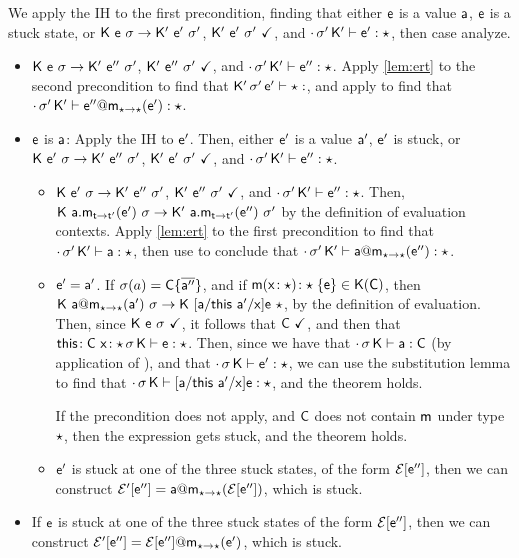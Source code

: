 \documentclass[acmlarge, anonymous, authordraft]{acmart}
\begin{document}
\begin{itemize}
      We apply the IH to the first precondition, finding that either ${\sf{e}}$ is a value ${\sf{a}}$, ${\sf{e}}$ is a stuck state, or ${{\sf{K}}}~{{\sf{e}}}~{\sigma} \rightarrow {{\ensuremath{{\sf{K'}}}}}~{{{{\sf{e'}}}}}~{{{\sigma'}}}$, ${{\sf{K'}}}~{{{\sf{e'}}}}~{{\sigma'}}~\checkmark$, and $\cdot\,{{\sigma'}}\,{{\sf{K'}}}\vdash {{\ensuremath{{\sf{e'}}}}} : \star$, then case analyze.
      \begin{itemize}
        \item ${{\sf{K}}}~{{\sf{e}}}~{\sigma} \rightarrow {{\ensuremath{{\sf{K'}}}}}~{{{{\sf{e''}}}}}~{{{\sigma'}}}$, ${{\sf{K'}}}~{{{\sf{e''}}}}~{{\sigma'}}~\checkmark$, and $\cdot\,{{\sigma'}}\,{{\sf{K'}}}\vdash {{\ensuremath{{\sf{e''}}}}} : \star$. Apply \ref{lem:ert} to the second precondition to find that $\EnvType\Kp\sp\ep\any$, and apply  to find that $\EnvType\cdot\sp\Kp{\DynCall\epp\m\ep}\any$.
        \item ${\sf{e}}$ is ${\sf{a}}$: Apply the IH to ${\sf{e}}'$. Then, either ${\sf{e}}'$ is a value ${\sf{a}}'$, ${\sf{e}}'$ is stuck, or ${{\sf{K}}}~{{{{\sf{e'}}}}}~{\sigma} \rightarrow {{\ensuremath{{\sf{K'}}}}}~{{{{\sf{e''}}}}}~{{{\sigma'}}}$, ${{\sf{K'}}}~{{{\sf{e'}}}}~{{\sigma'}}~\checkmark$, and $\cdot\,{{\sigma'}}\,{{\sf{K'}}}\vdash {{\ensuremath{{\sf{e''}}}}} : \star$. 
        \begin{itemize}
          \item ${{\sf{K}}}~{{{{\sf{e'}}}}}~{\sigma} \rightarrow {{\ensuremath{{\sf{K'}}}}}~{{{{\sf{e''}}}}}~{{{\sigma'}}}$, ${{\sf{K'}}}~{{{\sf{e''}}}}~{{\sigma'}}~\checkmark$, and $\cdot\,{{\sigma'}}\,{{\sf{K'}}}\vdash {{\ensuremath{{\sf{e''}}}}} : \star$. Then, $\Reduce\K{\KCall\a\m\ep\t\tp}\s\Kp{\KCall\a\m\epp\t\tp}\sp$ by the definition of evaluation contexts. Apply \ref{lem:ert} to the first precondition to find that $\cdot\,{{\sigma'}}\,{{\sf{K'}}}\vdash {\sf{a}} : \star$, then use  to conclude that $\EnvType\cdot\sp\Kp{\DynCall\a\m\epp}\any$.
          \item ${\sf{e}}' = {\sf{a}}'$. If $\sigma(a) = {\sf{C}}\{\overline{{\sf{a}}''}\}$, and if $ { {\sf{m}}( {{\sf{x}}}\!:{\star})}\!:{\star}\;\{{{\sf{e}}}\} \in {\sf{K}}({\sf{C}})$, then $\Reduce\K{\DynCall\a\m\ap}\s\K{[\a/\this ~ \ap/\x]\e}\any$, by the definition of evaluation. Then, since ${\sf{K}}~{\sf{e}}~\sigma~\checkmark$, it follows that ${\sf{C}}~\checkmark$, and then that ${{\sf{this}}}\!:{{\sf{C}}}~{{\sf{x}}}\!:{\star}\,\sigma\,{\sf{K}}\vdash {\sf{e}} : \star$. Then, since we have that $\cdot\,\sigma\,{\sf{K}}\vdash {\sf{a}} : {\sf{C}}$ (by application of ), and that $\cdot\,\sigma\,{\sf{K}}\vdash {{\ensuremath{{\sf{e'}}}}} : \star$, we can use the substitution lemma to find that $\cdot\,\sigma\,{\sf{K}}\vdash [{\sf{a}}/{\sf{this}} ~ {\sf{a}}'/{\sf{x}}]{\sf{e}} : \star$, and the theorem holds.


          If the precondition does not apply, and ${\sf{C}}$ does not contain ${\sf{m}}$ under type $\star$, then the expression gets stuck, and the theorem holds.
          \item ${\sf{e}}'$ is stuck at one of the three stuck states, of the form $\mathcal{E}[{{{\sf{e''}}}}]$, then we can construct $\EE'[\epp] = \DynCall\a\m{\EE[\epp]}$, which is stuck.
        \end{itemize}
        \item If ${\sf{e}}$ is stuck at one of the three stuck states of the form $\mathcal{E}[{{{\sf{e''}}}}]$, then we can construct $\mathcal{E}'[{{{\sf{e''}}}}] = \mathcal{E}[{{{\sf{e''}}}}]@{\sf{m}}_{\star\rightarrow\star}({{{\sf{e'}}}})$, which is stuck.
      \end{itemize}
      

\end{itemize}
\end{document}
